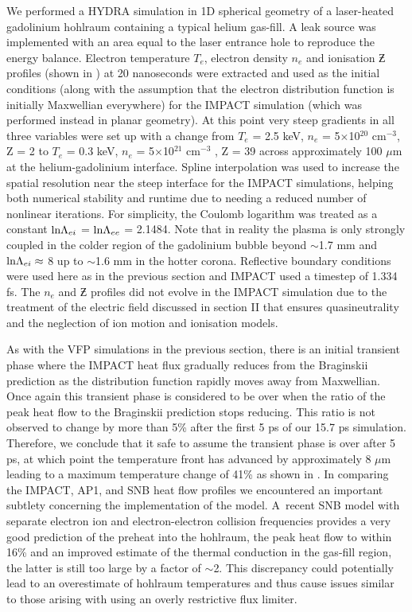 We performed a HYDRA simulation in 1D spherical
geometry of a laser-heated gadolinium hohlraum containing a typical helium 
gas-fill. A leak source was implemented with an area equal to 
the laser entrance hole to reproduce the energy balance. 
Electron temperature $T_e$, electron density $n_e$ and ionisation $\Zbar$ 
profiles (shown in ) at 20 nanoseconds 
were extracted and used as the initial conditions 
(along with the assumption that the electron distribution function is 
initially Maxwellian everywhere) for the IMPACT simulation 
(which was performed instead in planar geometry). At this point very
steep gradients in all three variables were set up with
a change from $T_e$ = 2.5 keV, $n_e$ = 5$\times$10$^{20}$ cm$^{−3}$, Z = 2
to $T_e$ = 0.3 keV, $n_e$ = 5$\times$10$^{21}$ cm$^{−3}$ , 
Z = 39 across approximately 100 $\mu$m at the helium-gadolinium interface.
Spline interpolation was used to increase the spatial resolution near 
the steep interface for the IMPACT simulations, helping both numerical 
stability and runtime due to needing a reduced number of nonlinear iterations.
For simplicity, the Coulomb logarithm was treated as a
constant $\text{ln}\Lambda_{ei}$ = $\text{ln}\Lambda_{ee}$ = 2.1484. Note that in reality
the plasma is only strongly coupled in the colder region of
the gadolinium bubble beyond $\sim$1.7 mm and $\text{ln}\Lambda_{ei}\approx$ 8
up to $\sim$1.6 mm in the hotter corona. Reflective boundary
conditions were used here as in the previous section and
IMPACT used a timestep of 1.334 fs. The $n_e$ and $\Zbar$ profiles did not 
evolve in the IMPACT simulation due to the treatment of the electric field 
discussed in section II that ensures quasineutrality and the neglection of 
ion motion and ionisation models.

As with the VFP simulations in the previous section,
there is an initial transient phase where the IMPACT
heat flux gradually reduces from the Braginskii prediction
as the distribution function rapidly moves away from
Maxwellian. Once again this transient phase is considered
to be over when the ratio of the peak heat flow to the
Braginskii prediction stops reducing. This ratio is not
observed to change by more than 5\% after the first 5 ps
of our 15.7 ps simulation. Therefore, we conclude that
it safe to assume the transient phase is over after 5 ps,
at which point the temperature front has advanced by
approximately 8 $\mu$m leading to a maximum temperature
change of 41\% as shown in .
In comparing the IMPACT, AP1, and SNB heat flow profiles
we encountered an important subtlety concerning the implementation of 
the model. A~recent SNB model with separate electron
ion and electron-electron collision frequencies provides a
very good prediction of the preheat into the hohlraum, the
peak heat flow to within 16\% and an improved estimate
of the thermal conduction in the gas-fill region, the latter
is still too large by a factor of $\sim$2. This discrepancy could
potentially lead to an overestimate of hohlraum temperatures and thus cause 
issues similar to those arising with
using an overly restrictive flux limiter.


